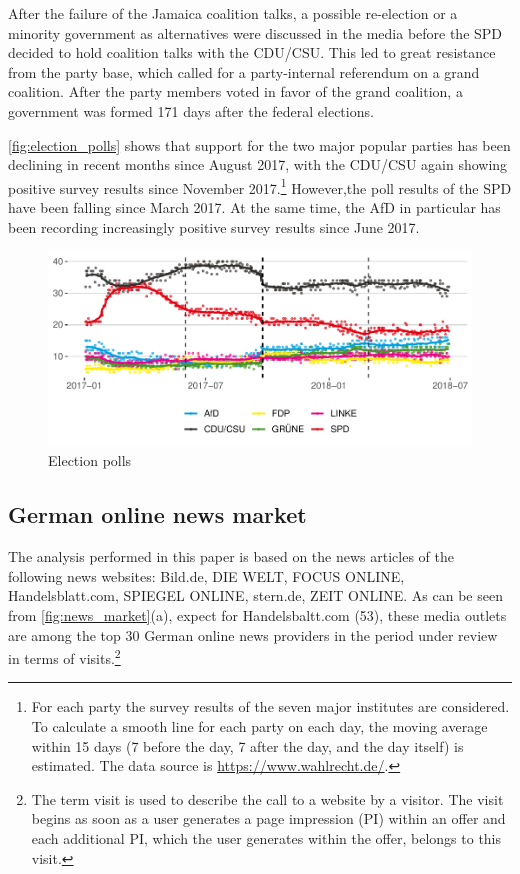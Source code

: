\documentclass[
]{article}
\begin{document}
After the failure of the Jamaica coalition talks, a possible re-election
or a minority government as alternatives were discussed in the media
before the SPD decided to hold coalition talks with the CDU/CSU. This
led to great resistance from the party base, which called for a
party-internal referendum on a grand coalition. After the party members
voted in favor of the grand coalition, a government was formed 171 days
after the federal elections.

\autoref{fig:election_polls} shows that support for the two major
popular parties has been declining in recent months since August 2017,
with the CDU/CSU again showing positive survey results since November
2017.\footnote{For each party the survey results of the seven major
  institutes are considered. To calculate a smooth line for each party
  on each day, the moving average within 15 days (7 before the day, 7
  after the day, and the day itself) is estimated. The data source is
  \url{https://www.wahlrecht.de/}.} However,the poll results of the SPD
have been falling since March 2017. At the same time, the AfD in
particular has been recording increasingly positive survey results since
June 2017.

\begin{figure}

{\centering \includegraphics[width=0.6\linewidth]{main_text_files/figure-latex/election polls-1} 

}

\caption{Election polls \label{fig:election_polls}}\label{fig:election polls}
\end{figure}

\hypertarget{german-online-news-market}{%
\subsection{German online news market}\label{german-online-news-market}}

The analysis performed in this paper is based on the news articles of
the following news websites: Bild.de, DIE WELT, FOCUS ONLINE,
Handelsblatt.com, SPIEGEL ONLINE, stern.de, ZEIT ONLINE. As can be seen
from \autoref{fig:news_market}(a), expect for Handelsbaltt.com (53),
these media outlets are among the top 30 German online news providers in
the period under review in terms of visits.\footnote{The term visit is
  used to describe the call to a website by a visitor. The visit begins
  as soon as a user generates a page impression (PI) within an offer and
  each additional PI, which the user generates within the offer, belongs
  to this visit.}
\end{document}
